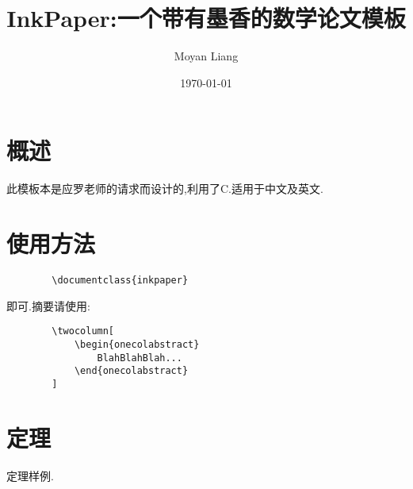 \documentclass[cn]{inkpaper}
\title{InkPaper:一个带有墨香的数学论文模板}
\author{Moyan Liang}
\date{\today}
\begin{document}
    \twocolumn[
        \maketitle
    ]
    \section{概述}
    此模板本是应罗老师的请求而设计的,利用了C.适用于中文及英文.
    \section{使用方法}
    \begin{lstlisting}
        \documentclass{inkpaper}
    \end{lstlisting}
    即可.摘要请使用:
    \begin{lstlisting}
        \twocolumn[
            \begin{onecolabstract}
                BlahBlahBlah...
            \end{onecolabstract}
        ]
    \end{lstlisting}
    \section{定理}
    \begin{theorem}
        定理样例.
    \end{theorem}
\end{document}
